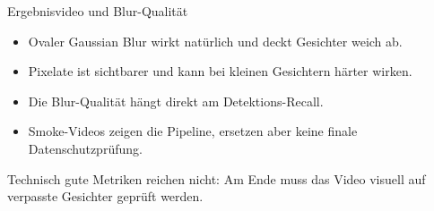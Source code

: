 \begin{frame}{Ergebnisvideo und Blur-Qualität}
\begin{itemize}
    \item Ovaler Gaussian Blur wirkt natürlich und deckt Gesichter weich ab.
    \item Pixelate ist sichtbarer und kann bei kleinen Gesichtern härter wirken.
    \item Die Blur-Qualität hängt direkt am Detektions-Recall.
    \item Smoke-Videos zeigen die Pipeline, ersetzen aber keine finale Datenschutzprüfung.
\end{itemize}
\vspace{0.6em}
\begin{mynote}[Qualitätscheck]
Technisch gute Metriken reichen nicht: Am Ende muss das Video visuell auf verpasste Gesichter geprüft werden.
\end{mynote}
\end{frame}
